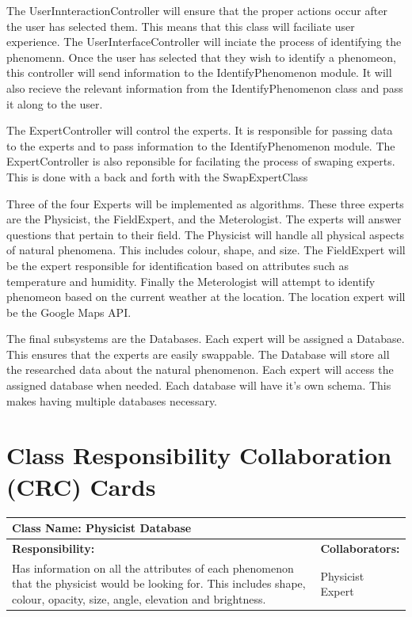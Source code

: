 \documentclass[]{article}
\begin{document}
 The UserInnteractionController will ensure that the proper actions occur after the user has selected them. This means that this class will faciliate user experience. The UserInterfaceController will inciate the process of identifying the phenomenn. Once the user has selected that they wish to identify a phenomeon, this controller will send information to the IdentifyPhenomenon module. It will also recieve the relevant information from the IdentifyPhenomenon class and pass it along to the user.
 
 The ExpertController will control the experts. It is responsible for passing data to the experts and to pass information to the IdentifyPhenomenon module. The ExpertController is also reponsible for facilating the process of swaping experts. This is done with a back and forth with the SwapExpertClass

Three of the four Experts will be implemented as algorithms. These three experts are the Physicist, the FieldExpert, and the Meterologist. The experts will answer questions that pertain to their field. The Physicist will handle all physical aspects of natural phenomena. This includes colour, shape, and size. The FieldExpert will be the expert responsible for identification based on attributes such as temperature and humidity. Finally the Meterologist will attempt to identify phenomeon based on the current weather at the location. The location expert will be the Google Maps API.

The final subsystems are the Databases. Each expert will be assigned a Database. This ensures that the experts are easily swappable. The Database will store all the researched data about the natural phenomenon. Each expert will access the assigned database when needed. Each database will have it's own schema. This makes having multiple databases necessary.   



	
\section{Class Responsibility Collaboration (CRC) Cards}
\label{sec:class_responsibility_collaboration_crc_cards}


	\begin{table}[ht]
		\centering
		\begin{tabular}{|p{5cm}|p{5cm}|}
		\hline 
		 \multicolumn{2}{|l|}{\textbf{Class Name: Physicist Database}} \\
		\hline
		\textbf{Responsibility:} & \textbf{Collaborators:} \\
		\hline
		Has information on all the attributes of each phenomenon that the physicist would be looking for. This includes shape, colour, opacity, size, angle, elevation and brightness. \vspace{1in} & Physicist Expert \\
		\hline
		\end{tabular}
	\end{table}
	
\end{document}

